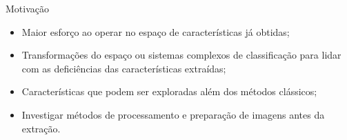 \documentclass{beamer}
\begin{document}
\begin{frame}{Motivação}
\setlength\leftmargini{0em}
\justifying
\begin{itemize}
\item Maior esforço ao operar no espaço de características já obtidas;
\item Transformações do espaço ou sistemas complexos de classificação para lidar com as deficiências das características extraídas;
\item Características que podem ser exploradas além dos métodos clássicos;
\item Investigar métodos de processamento e preparação de imagens antes da extração.
\end{itemize}
\end{frame}
\end{document}
